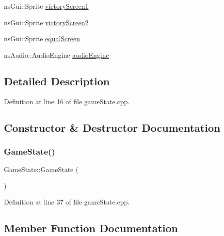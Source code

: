 \begin{DoxyCompactItemize}
\item 
ns\+Gui\+::\+Sprite \hyperlink{class_game_state_a82bb6889947656a95b7ea2ec9e50a9ac}{victory\+Screen1}
\item 
ns\+Gui\+::\+Sprite \hyperlink{class_game_state_abd3b617f8b2a9def4a1672d0c7a21235}{victory\+Screen2}
\item 
ns\+Gui\+::\+Sprite \hyperlink{class_game_state_ae78c31d27bb7a270a3dfd02f9442856e}{equal\+Screen}
\item 
ns\+Audio\+::\+Audio\+Engine \hyperlink{class_game_state_add088b04887aa7b73683ff610c70e311}{audio\+Engine}
\end{DoxyCompactItemize}


\subsection{Detailed Description}


Definition at line 16 of file game\+State.\+cpp.



\subsection{Constructor \& Destructor Documentation}
\mbox{\label{class_game_state_a4fa0a2bf50315c4a35a3890a0adcee5c}} 
\subsubsection{\texorpdfstring{Game\+State()}{GameState()}}
{\footnotesize\ttfamily Game\+State\+::\+Game\+State (\begin{DoxyParamCaption}{ }\end{DoxyParamCaption})\hspace{0.3cm}{\ttfamily [inline]}}



Definition at line 37 of file game\+State.\+cpp.



\subsection{Member Function Documentation}
\mbox{\label{class_game_state_a86a90115c9f75974b0dba76c057b2cee}} 
